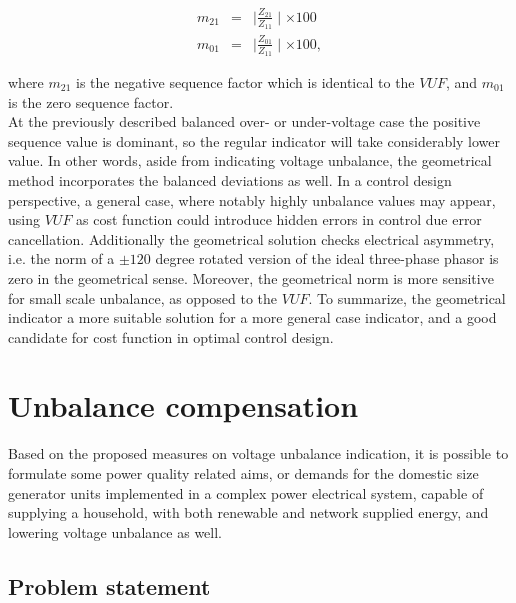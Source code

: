             \begin{equation}
                \begin{array}{rcl}
                       m_{21}&=&\mid\frac{Z_{21}}{Z_{11}}\mid\times100\\
                       m_{01}&=&\mid\frac{Z_{01}}{Z_{11}}\mid\times100,
                \end{array}
                \label{equ:factor}
            \end{equation}

where $m_{21}$ is the negative sequence factor which is identical to the $VUF$, and $m_{01}$ is the zero sequence factor.\\
At the previously described balanced over- or under-voltage case the positive sequence value is dominant, so the regular indicator will take considerably lower value. In other words, aside from indicating voltage unbalance, the geometrical method incorporates the balanced deviations as well. In a control design perspective, a general case, where notably highly unbalance values may appear, using $VUF$ as cost function could introduce hidden errors in control due error cancellation. Additionally the geometrical solution checks electrical asymmetry, i.e. the norm of a $\pm120$ degree rotated version of the ideal three-phase phasor is zero in the geometrical sense. Moreover, the geometrical norm is more sensitive for small scale unbalance, as opposed to the $VUF$. To summarize, the geometrical indicator a more suitable solution for a more general case indicator, and a good candidate for cost function in optimal control design.

\section{Unbalance compensation}\label{VUB:sec:Compensation}

Based on the proposed measures on voltage unbalance indication, it is possible to formulate some power quality related aims, or demands for the domestic size generator units implemented in a complex power electrical system, capable of supplying a household, with both renewable and network supplied energy, and lowering voltage unbalance as well.

\subsection{Problem statement}\label{VUB:sec:Statement}

